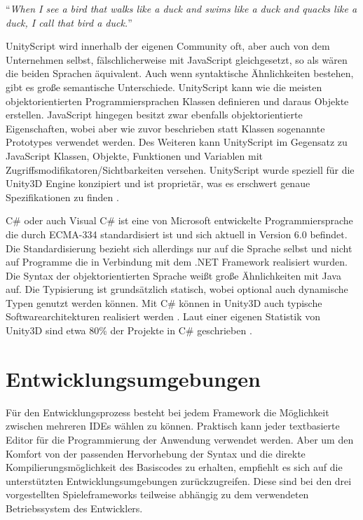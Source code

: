 \bigskip
“\emph{When I see a bird that walks like a duck and swims like a duck and quacks like a duck, I call that bird a duck.}” \citep{ducktest}


\bigskip
UnityScript wird innerhalb der eigenen Community oft, aber auch von dem Unternehmen selbst, fälschlicherweise mit JavaScript gleichgesetzt, so als wären die beiden Sprachen äquivalent. Auch wenn syntaktische Ähnlichkeiten bestehen, gibt es große semantische Unterschiede.
UnityScript kann wie die meisten objektorientierten Programmiersprachen Klassen definieren und daraus Objekte erstellen. JavaScript hingegen besitzt zwar ebenfalls objektorientierte Eigenschaften, wobei aber wie zuvor beschrieben statt Klassen sogenannte Prototypes verwendet werden. Des Weiteren kann UnityScript im Gegensatz zu JavaScript Klassen, Objekte, Funktionen und Variablen mit Zugriffsmodifikatoren/Sichtbarkeiten versehen. UnityScript wurde speziell für die Unity3D Engine konzipiert und ist proprietär, was es erschwert genaue Spezifikationen zu finden \citep{unity_unityscript_vs_javascript}. 

\bigskip
C\# oder auch Visual C\# ist eine von Microsoft entwickelte Programmiersprache die durch ECMA-334 standardisiert ist und sich aktuell in Version 6.0 befindet. Die Standardisierung bezieht sich allerdings nur auf die Sprache selbst und nicht auf Programme die in Verbindung mit dem .NET Framework realisiert wurden. Die Syntax der objektorientierten Sprache weißt große Ähnlichkeiten mit Java auf. Die Typisierung ist grundsätzlich statisch, wobei optional auch dynamische Typen genutzt werden können. Mit C\# können in Unity3D auch typische Softwarearchitekturen realisiert werden \citep{csharp_in_depth}. 
Laut einer eigenen Statistik von Unity3D sind etwa 80\% der Projekte in C\# geschrieben \citep{unity_languages}. 


\section{Entwicklungsumgebungen}
Für den Entwicklungsprozess besteht bei jedem Framework die Möglichkeit zwischen mehreren IDEs wählen zu können. Praktisch kann jeder textbasierte Editor für die Programmierung der Anwendung verwendet werden. Aber um den Komfort von der passenden Hervorhebung der Syntax und die direkte Kompilierungsmöglichkeit des Basiscodes zu erhalten, empfiehlt es sich auf die unterstützten Entwicklungsumgebungen zurückzugreifen. Diese sind bei den drei vorgestellten Spieleframeworks teilweise abhängig zu dem verwendeten Betriebssystem des Entwicklers.


